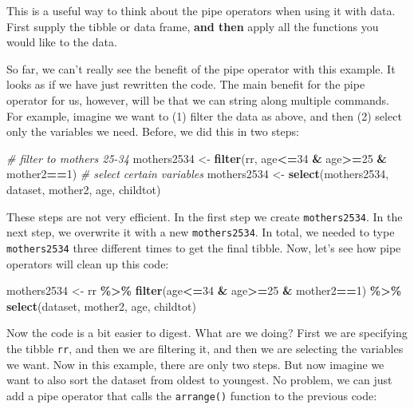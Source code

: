 \documentclass[
]{book}
\newenvironment{Shaded}{\begin{snugshade}}{\end{snugshade}}
\newcommand{\CommentTok}[1]{\textcolor[rgb]{0.56,0.35,0.01}{\textit{#1}}}
\newcommand{\DecValTok}[1]{\textcolor[rgb]{0.00,0.00,0.81}{#1}}
\newcommand{\FunctionTok}[1]{\textcolor[rgb]{0.13,0.29,0.53}{\textbf{#1}}}
\newcommand{\NormalTok}[1]{#1}
\newcommand{\OtherTok}[1]{\textcolor[rgb]{0.56,0.35,0.01}{#1}}
\newcommand{\SpecialCharTok}[1]{\textcolor[rgb]{0.81,0.36,0.00}{\textbf{#1}}}
\begin{document}
This is a useful way to think about the pipe operators when using it with data. First supply the tibble or data frame, \textbf{and then} apply all the functions you would like to the data.

So far, we can't really see the benefit of the pipe operator with this example. It looks as if we have just rewritten the code. The main benefit for the pipe operator for us, however, will be that we can string along multiple commands. For example, imagine we want to (1) filter the data as above, and then (2) select only the variables we need. Before, we did this in two steps:

\begin{Shaded}
\begin{Highlighting}[]
\CommentTok{\# filter to mothers 25{-}34}
\NormalTok{mothers2534 }\OtherTok{\textless{}{-}} \FunctionTok{filter}\NormalTok{(rr, age}\SpecialCharTok{\textless{}=}\DecValTok{34} \SpecialCharTok{\&}\NormalTok{ age}\SpecialCharTok{\textgreater{}=}\DecValTok{25} \SpecialCharTok{\&}\NormalTok{ mother2}\SpecialCharTok{==}\DecValTok{1}\NormalTok{)}
\CommentTok{\# select certain variables}
\NormalTok{mothers2534 }\OtherTok{\textless{}{-}} \FunctionTok{select}\NormalTok{(mothers2534, dataset, mother2, age, childtot)}
\end{Highlighting}
\end{Shaded}

These steps are not very efficient. In the first step we create \texttt{mothers2534}. In the next step, we overwrite it with a new \texttt{mothers2534}. In total, we needed to type \texttt{mothers2534} three different times to get the final tibble. Now, let's see how pipe operators will clean up this code:

\begin{Shaded}
\begin{Highlighting}[]
\NormalTok{mothers2534 }\OtherTok{\textless{}{-}}\NormalTok{ rr }\SpecialCharTok{\%\textgreater{}\%}
  \FunctionTok{filter}\NormalTok{(age}\SpecialCharTok{\textless{}=}\DecValTok{34} \SpecialCharTok{\&}\NormalTok{ age}\SpecialCharTok{\textgreater{}=}\DecValTok{25} \SpecialCharTok{\&}\NormalTok{ mother2}\SpecialCharTok{==}\DecValTok{1}\NormalTok{) }\SpecialCharTok{\%\textgreater{}\%}
  \FunctionTok{select}\NormalTok{(dataset, mother2, age, childtot)}
\end{Highlighting}
\end{Shaded}

Now the code is a bit easier to digest. What are we doing? First we are specifying the tibble \texttt{rr}, and then we are filtering it, and then we are selecting the variables we want. Now in this example, there are only two steps. But now imagine we want to also sort the dataset from oldest to youngest. No problem, we can just add a pipe operator that calls the \texttt{arrange()} function to the previous code:
\end{document}
